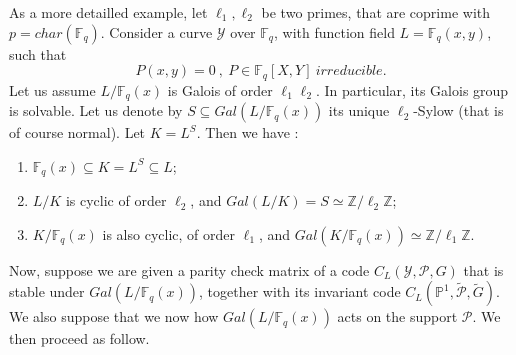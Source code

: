 \documentclass[10pt]{article}
\newcommand{\Z}{\mathbb{Z}}
\newcommand{\fq}{\mathbb{F}_q}
\newcommand{\su}{\subseteq}
\newcommand{\Y}{\mathcal{Y}}
\newcommand{\PR}{\mathcal{P}}
\begin{document}
As a more detailled example, let $\ell_1,\ell_2$ be two primes, that are coprime with $p=char(\fq)$. Consider a curve $\Y$ over $\fq$, with function field $L = \fq(x,y)$, such that
\[P(x,y) = 0 \ , \ P \in \fq[X,Y] \ irreducible .\]
Let us assume $L/\fq(x)$ is Galois of order $\ell_1\ell_2$. In particular, its Galois group is solvable. Let us denote by $S \su Gal(L/\fq(x))$ its unique $\ell_2$-Sylow (that is of course normal). Let $K = L^S$. Then we have :
\begin{enumerate}
\item  $\fq(x) \su K=L^S \su L$;
\item $L/K$ is cyclic of order $\ell_2$, and $Gal(L/K) = S \simeq \Z/\ell_2\Z$;
\item $K/\fq(x)$ is also cyclic, of order $\ell_1$, and $Gal(K/\fq(x)) \simeq \Z/\ell_1\Z$.
\end{enumerate}

Now, suppose we are given a parity check matrix of a code $C_L(\Y,\PR,G)$ that is stable under $Gal(L/\fq(x))$, together with its invariant code $C_L(\mathbb{P}^1,\tilde{\PR},\tilde{G})$. We also suppose that we now how $Gal(L/\fq(x))$ acts on the support $\PR$. We then proceed as follow.
\end{document}
